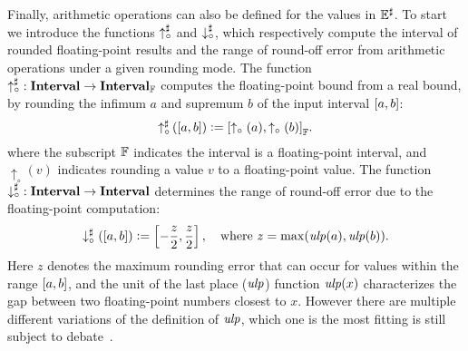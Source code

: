 Finally, arithmetic operations can also be defined for the values in
$\mathbb{E}^\sharp$.  To start we introduce the functions $\operatorname{\uparrow^\sharp_\circ}$ and
$\operatorname{\downarrow^\sharp_\circ}$, which respectively compute the interval of rounded
floating-point results and the range of round-off error from arithmetic
operations under a given rounding mode.  The function $\operatorname{\uparrow^\sharp_\circ}: \mathbf{Interval}
\to \mathbf{Interval}_\mathbb{F}$ computes the floating-point bound from a real
bound, by rounding the infimum $a$ and supremum $b$ of the input interval
$\left[{a}, {b}\right]$:
\begin{equation}
    \operatorname{\uparrow^\sharp_\circ}\left(\left[a, b\right]\right)
    \vcentcolon= {\left[
        \uparrow_\circ{\left(a\right)},
        \uparrow_\circ{\left(b\right)}
    \right]}_\mathbb{F}.
\end{equation}
where the subscript $\mathbb{F}$ indicates the interval is a floating-point
interval, and $\uparrow_\circ{\left(v\right)}$ indicates rounding a value
$v$ to a floating-point value.  The function $\operatorname{\downarrow^\sharp_\circ}: \mathbf{Interval} \to
\mathbf{Interval}$ determines the range of round-off error due to the floating-point
computation:
\begin{equation}
    \downarrow^\sharp_\circ(\left[{a}, {b}\right]) \vcentcolon=
        \left[ -\frac{z}{2}, \frac{z}{2}\right], \quad \text{where~}
        z = \max(\operatorname{\mathit{ulp}}(a), \operatorname{\mathit{ulp}}(b)).
\end{equation}
Here $z$ denotes the maximum rounding error that can occur for values
within the range $\left[{a}, {b}\right]$, and the unit of the last place ($\operatorname{\mathit{ulp}}$)
function $\operatorname{\mathit{ulp}}(x)$ characterizes the gap between two floating-point numbers
closest to $x$.  However there are multiple different variations of the
definition of $\operatorname{\mathit{ulp}}$, which one is the most fitting is still subject to
debate~\cite{muller}.

